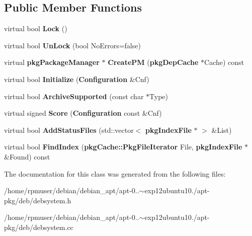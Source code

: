 \subsection*{\-Public \-Member \-Functions}
\begin{DoxyCompactItemize}
\item 
virtual bool {\bfseries \-Lock} ()\label{classdebSystem_a747fd95916e116a6ed37cc641e394c69}

\item 
virtual bool {\bfseries \-Un\-Lock} (bool \-No\-Errors=false)\label{classdebSystem_ab45e970c8ea44bbb120af41fc5e2a43f}

\item 
virtual {\bf pkg\-Package\-Manager} $\ast$ {\bfseries \-Create\-P\-M} ({\bf pkg\-Dep\-Cache} $\ast$\-Cache) const \label{classdebSystem_a9b88e90152156861fc5210e5598d69aa}

\item 
virtual bool {\bfseries \-Initialize} ({\bf \-Configuration} \&\-Cnf)\label{classdebSystem_a295ecf204cefa8729680c2cfdfe7051a}

\item 
virtual bool {\bfseries \-Archive\-Supported} (const char $\ast$\-Type)\label{classdebSystem_a4acb4ef24def19ad4b45c1f10d49f185}

\item 
virtual signed {\bfseries \-Score} ({\bf \-Configuration} const \&\-Cnf)\label{classdebSystem_ad46f817fa35d0bb611e490eb63d44c3d}

\item 
virtual bool {\bfseries \-Add\-Status\-Files} (std\-::vector$<$ {\bf pkg\-Index\-File} $\ast$ $>$ \&\-List)\label{classdebSystem_a87cb2c8845646cd04fb231da6f1721f7}

\item 
virtual bool {\bfseries \-Find\-Index} ({\bf pkg\-Cache\-::\-Pkg\-File\-Iterator} \-File, {\bf pkg\-Index\-File} $\ast$\&\-Found) const \label{classdebSystem_a5a001ca1f36543c5906681574a0b654d}

\end{DoxyCompactItemize}


\-The documentation for this class was generated from the following files\-:\begin{DoxyCompactItemize}
\item 
/home/rpmuser/debian/debian\-\_\-apt/apt-\/0..$\sim$exp12ubuntu10./apt-\/pkg/deb/debsystem.\-h\item 
/home/rpmuser/debian/debian\-\_\-apt/apt-\/0..$\sim$exp12ubuntu10./apt-\/pkg/deb/debsystem.\-cc\end{DoxyCompactItemize}
